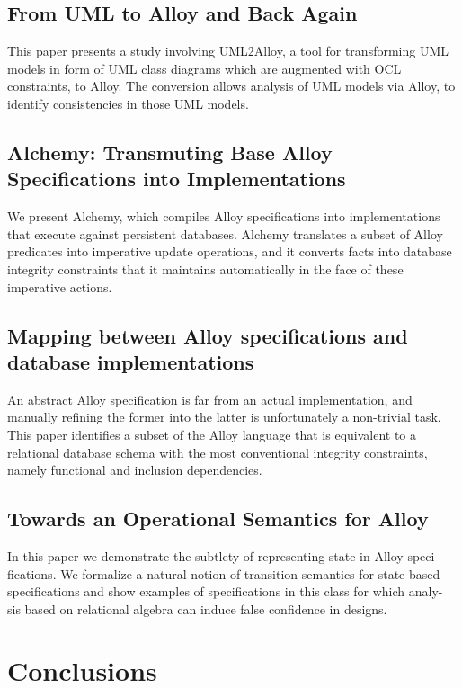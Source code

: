\documentclass[oneside]{book}
\begin{document}
\section{From UML to Alloy and Back Again}
This paper presents a study involving UML2Alloy, a tool for transforming
UML models in form of UML class diagrams which are augmented with
OCL constraints, to Alloy. The conversion allows analysis of UML models
via Alloy, to identify consistencies in those UML models.

\section{Alchemy: Transmuting Base Alloy Specifications into Implementations}
We present Alchemy, which compiles Alloy specifications into implementations that execute against persistent databases. Alchemy translates a subset of Alloy predicates into imperative update operations, and it converts facts into database integrity constraints that it maintains automatically in the face of these imperative actions.

\section{Mapping between Alloy specifications and database implementations}
An abstract Alloy specification is far from an actual implementation, and manually refining the former into the latter is unfortunately a non-trivial task. This paper identifies a subset of the Alloy language that is equivalent to a relational database schema with the most conventional integrity constraints, namely functional and inclusion dependencies.

\section{Towards an Operational Semantics for Alloy}
In this paper we demonstrate the subtlety of representing state in Alloy speci- fications. We formalize a natural notion of transition semantics for state-based specifications and show examples of specifications in this class for which analy- sis based on relational algebra can induce false confidence in designs.

\newpage

\chapter{Conclusions}
\end{document}
